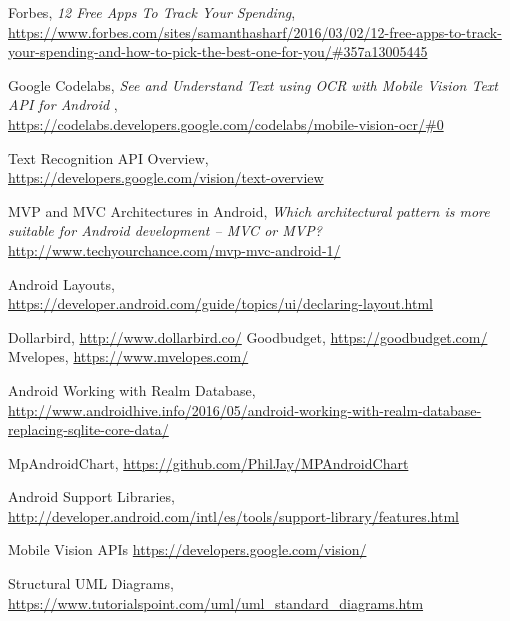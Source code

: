\begin{thebibliography}{99999}
\singlespace\normalsize

 Forbes, \textit{12 Free Apps To Track Your Spending}, \\ \url{https://www.forbes.com/sites/samanthasharf/2016/03/02/12-free-apps-to-track-your-spending-and-how-to-pick-the-best-one-for-you/#357a13005445} %

 Google Codelabs, \textit{See and Understand Text using OCR with Mobile Vision Text API for Android} , \\ \url{https://codelabs.developers.google.com/codelabs/mobile-vision-ocr/#0} %

 Text Recognition API Overview, \\
\url{https://developers.google.com/vision/text-overview} %

 MVP and MVC Architectures in Android, \textit{Which architectural pattern is more suitable for Android development – MVC or MVP?} \\
\url{http://www.techyourchance.com/mvp-mvc-android-1/} %

Android Layouts, \\ \url{https://developer.android.com/guide/topics/ui/declaring-layout.html} %

 Dollarbird, \url{http://www.dollarbird.co/} %
 Goodbudget, \url{https://goodbudget.com/} %
 Mvelopes, \url{https://www.mvelopes.com/}

 Android Working with Realm Database, \\ \url{http://www.androidhive.info/2016/05/android-working-with-realm-database-replacing-sqlite-core-data/}

 MpAndroidChart, \url{https://github.com/PhilJay/MPAndroidChart}

 Android Support Libraries, \\
\url{http://developer.android.com/intl/es/tools/support-library/features.html}

 Mobile Vision APIs \url{https://developers.google.com/vision/}

 Structural UML Diagrams, \url{https://www.tutorialspoint.com/uml/uml_standard_diagrams.htm}
\end{thebibliography}

